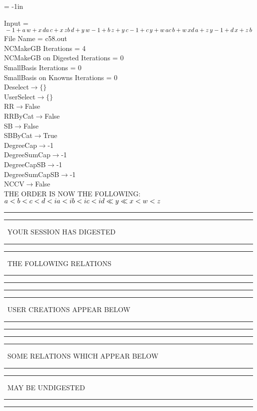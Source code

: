 \voffset = -1in
\evensidemargin 0.1in
\oddsidemargin 0.1in
\textheight 9in
\textwidth 6in

\normalsize
\baselineskip=12pt
\noindent
Input = 
$
\\-1 + a\,
 w + x\,
 d\\
a\,
 c + x\,
 z\\
b\,
 d + y\,
 w\\
-1 + b\,
 z + y\,
 c\\
-1 + c\,
 y + w\,
 a\\
c\,
 b + w\,
 x\\
d\,
 a + z\,
 y\\
-1 + d\,
 x + z\,
 b\\
$
File Name = c58.out\\
NCMakeGB Iterations = 4\\
NCMakeGB on Digested Iterations = 0\\
SmallBasis Iterations = 0\\
SmallBasis on Knowns Iterations = 0\\
Deselect$\rightarrow \{\}$\\
UserSelect$\rightarrow \{\}$\\
RR$\rightarrow $False\\
RRByCat$\rightarrow $False\\
SB$\rightarrow $False\\
SBByCat$\rightarrow $True\\
DegreeCap$\rightarrow $-1\\
DegreeSumCap$\rightarrow $-1\\
DegreeCapSB$\rightarrow $-1\\
DegreeSumCapSB$\rightarrow $-1\\
NCCV$\rightarrow $False\\
THE ORDER IS NOW THE FOLLOWING:\hfil\break
$
a<b<c<d<ia<ib<ic<id\ll
y\ll
x<w<z\\
$
\rule[2pt]{6in}{4pt}\hfil\break
\rule[2pt]{1.879in}{4pt}
\ YOUR SESSION HAS DIGESTED\ 
\rule[2pt]{1.879in}{4pt}\hfil\break
\rule[2pt]{1.923in}{4pt}
\ THE FOLLOWING RELATIONS\ 
\rule[2pt]{1.923in}{4pt}\hfil\break
\rule[2pt]{6in}{4pt}\hfil\break
\rule[2pt]{6in}{1pt}\hfil\break
\rule[2.5pt]{1.701in}{1pt}
\ USER CREATIONS APPEAR BELOW\ 
\rule[2.5pt]{1.701in}{1pt}\hfil\break
\rule[2pt]{6in}{1pt}\hfil\break
\rule[2pt]{6in}{4pt}\hfil\break
\rule[2pt]{1.45in}{4pt}
\ SOME RELATIONS WHICH APPEAR BELOW\ 
\rule[2pt]{1.45in}{4pt}\hfil\break
\rule[2pt]{2.18in}{4pt}
\ MAY BE UNDIGESTED\ 
\rule[2pt]{2.18in}{4pt}\hfil\break
\rule[2pt]{6in}{4pt}\hfil\break
